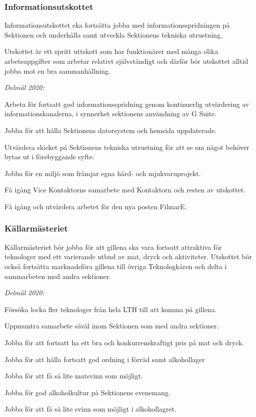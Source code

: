 \documentclass[../_main/handlingar.tex]{subfiles}
\begin{document}
\newpage

\subsubsection*{Informationsutskottet}
Informationsutskottet ska fortsätta jobba med informationsspridningen på Sektionen och underhålla samt utveckla Sektionens tekniska utrustning. 
 
Utskottet är ett spritt uttskott som har funktionärer med många olika arbetsuppgifter som arbetar relativt självständigt och därför bör utskottet alltid jobba mot en bra sammanhållning.

\emph{Delmål 2020:}
\begin{dashlist}
	\item Arbeta för fortsatt god informationsspridning genom kontinuerlig utvärdering av informationskanalerna, i synnerhet sektionens användning av G Suite. 
	\item Jobba för att hålla Sektionens datorsystem och hemsida uppdaterade.
	\item Utvärdera skicket på Sektionens tekniska utrustning för att se om något behöver bytas ut i förebyggande syfte.
	\item Jobba för en miljö som främjar egna hård- och mjukvaruprojekt. 
	\item Få igång Vice Kontaktorns samarbete med Kontaktorn och resten av utskottet.
	\item Få igång och utvärdera arbetet för den nya posten FilmarE.
\end{dashlist}

\subsubsection*{Källarmästeriet}
Källarmästeriet bör jobba för att gillena ska vara fortsatt attraktiva för teknologer med ett varierande utbud av mat, dryck och aktiviteter. Utskottet bör också fortsätta marknadsföra gillena till övriga Teknologkåren och delta i sammarbeten med andra sektioner.

\emph{Delmål 2020:}
\begin{dashlist}
	\item Försöka locka fler teknologer från hela LTH till att komma på gillena.
	\item Uppmuntra samarbete såväl inom Sektionen som med andra sektioner.
	\item Jobba för att fortsatt ha ett bra och konkurrenskraftigt pris på mat och dryck.
	\item Jobba för att hålla fortsatt god ordning i förråd samt alkohollager
	\item Jobba för att få så lite matsvinn som möjligt.
	\item Jobba för god alkoholkultur på Sektionens evenemang.
	\item Jobba för att få så lite svinn som möjligt i alkohollagret.
\end{dashlist}
\newpage
\end{document}
